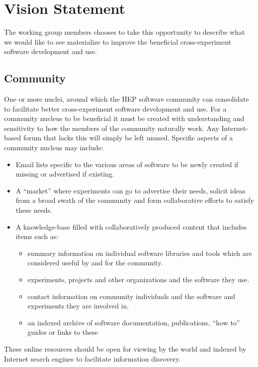 \section{Vision Statement}

The working group members chooses to take this opportunity to describe
what we would like to see materialize to improve the beneficial
cross-experiment software development and use.

\subsection{Community}

One or more nuclei, around which the HEP software community can
consolidate to facilitate better cross-experiment software development
and use.  For a community nucleus to be beneficial it must be created
with understanding and sensitivity to how the members of the community
naturally work.  Any Internet-based forum that lacks this will simply
be left unused.  Specific aspects of a community nucleus may include:

\begin{itemize}
\item Email lists specific to the various areas of software to be
  newly created if missing or advertised if existing.
\item A ``market'' where experiments can go to advertise their needs,
  solicit ideas from a broad swath of the community and form
  collaborative efforts to satisfy these needs.
\item A knowledge-base filled with collaboratively produced content
  that includes items such as:
  \begin{itemize}
  \item summary information on individual software libraries and tools
    which are considered useful by and for the community.
  \item experiments, projects and other organizations and the software they use.
  \item contact information on community individuals and the software
    and experiments they are involved in.
  \item an indexed archive of software documentation, publications,
    ``how to'' guides or links to these
  \end{itemize}
\end{itemize}

\noindent These online resources should be open for viewing by the world and
indexed by Internet search engines to facilitate information
discovery.

